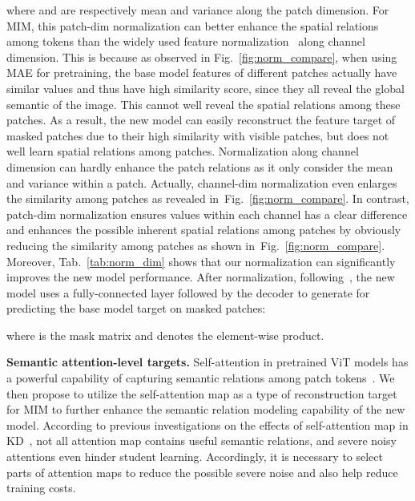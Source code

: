 \documentclass{article} \usepackage{iclr2023_conference,times}
\def\figref#1{figure~\ref{#1}}
\def\secref#1{section~\ref{#1}}
\newcommand{\myPara}[1]{\vspace{-.05in} \noindent\textbf{#1}}
\renewcommand{\figref}[1]{Fig.~\ref{#1}}\newcommand{\tabref}[1]{Tab.~\ref{#1}}\renewcommand{\secref}[1]{Section~\ref{#1}}
\begin{document}
where  and  are respectively mean and variance along the patch dimension.  For MIM, this patch-dim normalization can better enhance the spatial relations among tokens than the widely used feature normalization~\citep{wei2022contrastive,wei2022masked,baevski2022data2vec} along channel dimension. 
This is because as observed in Fig.~\ref{fig:norm_compare}, when using MAE for pretraining, the base model features of different patches actually have similar values and thus have high similarity score, since they all reveal the global semantic of the image. This cannot well reveal the  spatial relations among these patches. 
As a result,
the new model can easily reconstruct the feature target of masked
patches due to their high similarity with visible  patches, but does not well learn  spatial relations among patches.
Normalization along channel dimension can hardly enhance
the patch relations as it only consider the mean and variance within a patch. Actually, channel-dim normalization even enlarges the similarity among patches
as revealed in~\figref{fig:norm_compare}.
In contrast, patch-dim normalization ensures values within each channel has a clear difference 
and enhances the possible inherent spatial relations among patches by obviously reducing the similarity among patches as shown in~\figref{fig:norm_compare}. 
Moreover, \tabref{tab:norm_dim} shows that our normalization can significantly improves the new model  performance.   
After normalization, following~\citep{he2022masked}, the new model uses a fully-connected layer followed by the decoder to generate  for predicting the  base model target   on masked patches:

where  is the mask matrix and  denotes the element-wise product. 


\myPara{Semantic attention-level targets.}
Self-attention  in pretrained ViT models has a powerful capability of capturing semantic relations among  patch tokens~\citep{caron2021emerging,li2022exploringself}.  
We then propose to utilize the self-attention map as a type of reconstruction target for MIM to further enhance the semantic relation modeling capability of the new model.
According to previous investigations on the effects of self-attention map in KD~\citep{wu2022self,wang2022closer}, not all attention map contains  useful semantic relations, and severe noisy attentions even hinder student learning. 
Accordingly, it is necessary to select parts of attention maps to reduce the possible severe noise and also help reduce training costs.
\end{document}

